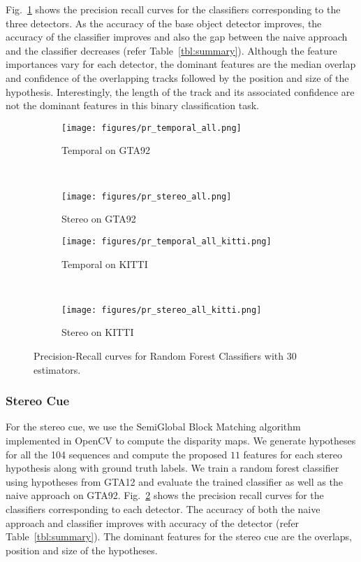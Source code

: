 \documentclass[letterpaper, 10 pt, journal, twoside]{IEEEtran}  %
\begin{document}
Fig.~\ref{fig:pr_curve_temporal} shows the precision recall curves for the classifiers corresponding to the three detectors. As the accuracy of the base object detector improves, the accuracy of the classifier improves and also the gap between the naive approach and the classifier decreases (refer Table~\ref{tbl:summary}). 
Although the feature importances vary for each detector, the dominant features are the median overlap and confidence of the overlapping tracks followed by the position and size of the hypothesis. Interestingly, the length of the track and its associated confidence are not the dominant features in this binary classification task.

\begin{figure}[t]
    \centering
    \begin{subfigure}[t]{0.4\linewidth}
        \texttt{[image: figures/pr\_temporal\_all.png]}
        \caption{Temporal on GTA92}
        \label{fig:pr_curve_temporal}
    \end{subfigure}~
    \begin{subfigure}[t]{0.4\linewidth}
        \texttt{[image: figures/pr\_stereo\_all.png]}
        \caption{Stereo on GTA92}
        \label{fig:pr_curve_stereo}
    \end{subfigure}
    \begin{subfigure}[t]{0.4\linewidth}
        \texttt{[image: figures/pr\_temporal\_all\_kitti.png]}
        \caption{Temporal on KITTI}
        \label{fig:pr_curve_temporal_kitti}
    \end{subfigure}~
    \begin{subfigure}[t]{0.4\linewidth}
        \texttt{[image: figures/pr\_stereo\_all\_kitti.png]}
        \caption{Stereo on KITTI}
        \label{fig:pr_curve_stereo_kitti}
    \end{subfigure}
    \caption{Precision-Recall curves for Random Forest Classifiers with 30 estimators. }
    \label{fig:random_forest_classifier}
\end{figure}

\subsubsection{Stereo Cue} For the stereo cue, we use the SemiGlobal Block Matching algorithm~\cite{hirschmuller2008stereo} implemented in OpenCV to compute the disparity maps.
We generate hypotheses for all the 104 sequences and compute the proposed $11$ features for each stereo hypothesis along with ground truth labels. We train a random forest classifier using hypotheses from GTA12 and evaluate the trained classifier as well as the naive approach on GTA92.
Fig.~\ref{fig:pr_curve_stereo} shows the precision recall curves for the classifiers corresponding to each detector. The accuracy of both the naive approach and classifier improves with accuracy of the detector (refer Table~\ref{tbl:summary}).
The dominant features for the stereo cue are the overlaps, position and size of the hypotheses.
\end{document}
